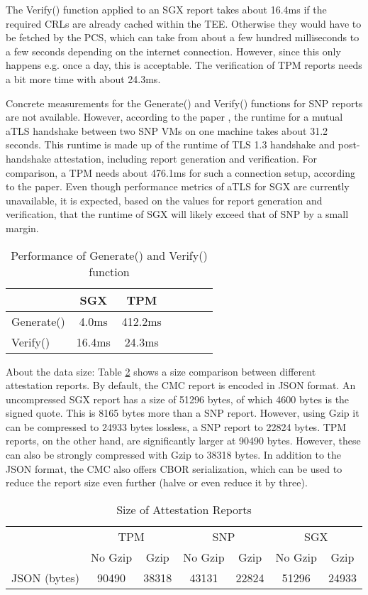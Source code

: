 The Verify() function applied to an SGX report takes about 16.4ms if the required CRLs are already cached within the TEE. Otherwise they would have to be fetched by the PCS, which can take from about a few hundred milliseconds to a few seconds depending on the internet connection. However, since this only happens e.g. once a day, this is acceptable.
The verification of TPM reports needs a bit more time with about 24.3ms.

Concrete measurements for the Generate() and Verify() functions for SNP reports are not available. However, according to the paper \cite{CMC_paper}, the runtime for a mutual aTLS handshake between two SNP VMs on one machine takes about 31.2 seconds. This runtime is made up of the runtime of TLS 1.3 handshake and post-handshake attestation, including report generation and verification. For comparison, a TPM needs about 476.1ms for such a connection setup, according to the paper. Even though performance metrics of aTLS for SGX are currently unavailable, it is expected, based on the values for report generation and verification, that the runtime of SGX will likely exceed that of SNP by a small margin.

\begin{table}[ht]
	\centering
	\begin{tabular}{lcccccc}
		\toprule
		& SGX &  TPM \\
		\midrule
		Generate() & 4.0ms  &  412.2ms \\
		Verify()  & 16.4ms & 24.3ms \\
		\bottomrule
	\end{tabular}
	\caption{Performance of Generate() and Verify() function}
	\label{table:performance}
\end{table}


About the data size: 
Table \ref{table:report_size} shows a size comparison between different attestation reports. By default, the CMC report is encoded in JSON format. An uncompressed SGX report has a size of 51296 bytes, of which 4600 bytes is the signed quote. This is 8165 bytes more than a SNP report. However, using Gzip it can be compressed to 24933 bytes lossless, a SNP report to 22824 bytes. TPM reports, on the other hand, are significantly larger at 90490 bytes. However, these can also be strongly compressed with Gzip to 38318 bytes. 
In addition to the JSON format, the CMC also offers CBOR serialization, which can be used to reduce the report size even further (halve or even reduce it by three).

\begin{table}[ht]
	\centering
	\begin{tabular}{lcccccc}
		\toprule
		& \multicolumn{2}{c}{TPM} & \multicolumn{2}{c}{SNP} & \multicolumn{2}{c}{SGX} \\
		\cmidrule(lr){2-3} \cmidrule(lr){4-5} \cmidrule(lr){6-7}
		& No Gzip & Gzip & No Gzip & Gzip & No Gzip & Gzip \\
		\midrule
		JSON (bytes) & 90490 & 38318 & 43131 & 22824 & 51296 & 24933 \\
		\bottomrule
	\end{tabular}
	\caption{Size of Attestation Reports \cite{CMC_paper}}
	\label{table:report_size}
\end{table}

